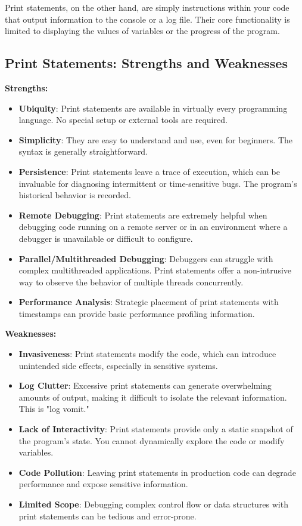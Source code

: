 \documentclass{article}
\begin{document}
Print statements, on the other hand, are simply instructions within your code that output information to the console or a log file. Their core functionality is limited to displaying the values of variables or the progress of the program.

\subsection*{Print Statements: Strengths and Weaknesses}

\textbf{Strengths:}

\begin{itemize}
    \item \textbf{Ubiquity}: Print statements are available in virtually every programming language. No special setup or external tools are required.
    \item \textbf{Simplicity}: They are easy to understand and use, even for beginners.  The syntax is generally straightforward.
    \item \textbf{Persistence}: Print statements leave a trace of execution, which can be invaluable for diagnosing intermittent or time-sensitive bugs. The program's historical behavior is recorded.
    \item \textbf{Remote Debugging}:  Print statements are extremely helpful when debugging code running on a remote server or in an environment where a debugger is unavailable or difficult to configure.
    \item \textbf{Parallel/Multithreaded Debugging}: Debuggers can struggle with complex multithreaded applications. Print statements offer a non-intrusive way to observe the behavior of multiple threads concurrently.
    \item \textbf{Performance Analysis}:  Strategic placement of print statements with timestamps can provide basic performance profiling information.
\end{itemize}

\textbf{Weaknesses:}

\begin{itemize}
    \item \textbf{Invasiveness}: Print statements modify the code, which can introduce unintended side effects, especially in sensitive systems.
    \item \textbf{Log Clutter}: Excessive print statements can generate overwhelming amounts of output, making it difficult to isolate the relevant information.  This is "log vomit."
    \item \textbf{Lack of Interactivity}: Print statements provide only a static snapshot of the program's state. You cannot dynamically explore the code or modify variables.
    \item \textbf{Code Pollution}: Leaving print statements in production code can degrade performance and expose sensitive information.
    \item \textbf{Limited Scope}: Debugging complex control flow or data structures with print statements can be tedious and error-prone.
\end{itemize}
\end{document}
